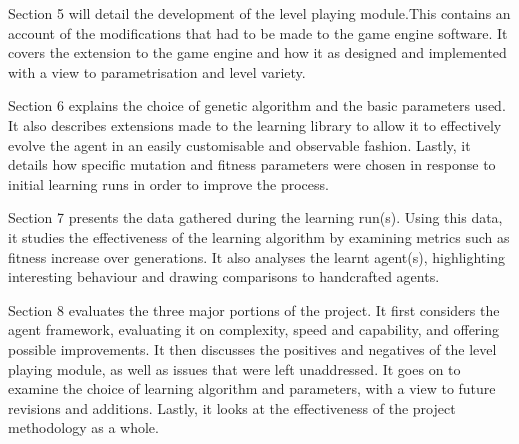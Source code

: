 Section 5 will detail the development of the level playing module.This contains an account of the modifications that had to be made to the game engine software. It covers the extension to the game engine and how it as designed and implemented with a view to parametrisation and level variety.

Section 6 explains the choice of genetic algorithm and the basic parameters used. It also describes extensions made to the learning library to allow it to effectively evolve the agent in an easily customisable and observable fashion. Lastly, it details how specific mutation and fitness parameters were chosen in response to initial learning runs in order to improve the process.

Section 7 presents the data gathered during the learning run(s). Using this data, it studies the effectiveness of the learning algorithm by examining metrics such as fitness increase over generations. It also analyses the learnt agent(s), highlighting interesting behaviour and drawing comparisons to handcrafted agents.

Section 8 evaluates the three major portions of the project. It first considers the agent framework, evaluating it on complexity, speed and capability, and offering possible improvements. It then discusses the positives and negatives of the level playing module, as well as issues that were left unaddressed. It goes on to examine the choice of learning algorithm and parameters, with a view to future revisions and additions. Lastly, it looks at the effectiveness of the project methodology as a whole.



